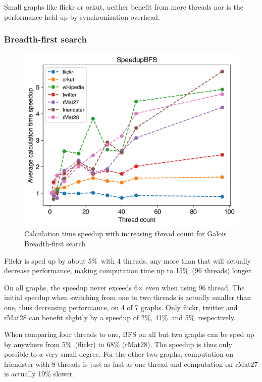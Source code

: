 Small graphs like flickr or orkut, neither benefit from more threads nor is the performance held up by synchronization overhead. 



\subsubsection{Breadth-first search}
\begin{figure}
	\includegraphics[width=\linewidth]{../../plots/singleNodeBFSGaloisThreads.png}
	\caption{Calculation time speedup with increasing thread count for Galois Breadth-first search}
	\label{fig:galoisSpeedupBFS}
\end{figure}


Flickr is sped up by about 5\%\ with 4 threads, any more than that will actually decrease performance, making computation time up to 15\%\ (96 threads) longer.

On all graphs, the speedup never exceeds 6$\times$ even when using 96 thread.
The initial speedup when switching from one to two threads is actually smaller than one, thus decreasing performance, on 4 of 7 graphs. Only flickr, twitter and rMat28 can benefit slightly by a speedup of 2\%, 41\%\ and 5\%\ respectively.

When comparing four threads to one, BFS on all but two graphs can be sped up by anywhere from 5\%\ (flickr) to 68\% (rMat28). The speedup is thus only possible to a very small degree.
For the other two graphs, computation on friendster with 8 threads is just as fast as one thread and computation on rMat27 is actually 19\% slower.








